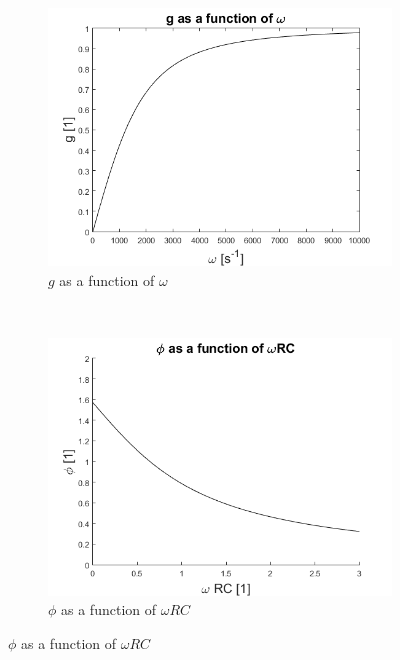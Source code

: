 \documentclass[../main/main.tex]{subfiles}
\begin{document}
\begin{figure}[!ht]
  \centering
  \begin{subfigure}[b]{0.4\textwidth}
      \includegraphics[width=\textwidth]{../img/g_af_omega.png}
      \caption{\( g \) as a function of \( \omega \)}
      \label{fig:g_af_omega}
  \end{subfigure}
  ~ %
  \begin{subfigure}[b]{0.4\textwidth}
      \includegraphics[width=\textwidth]{../img/phi_af_wRC.png}
      \caption{\( \phi \) as a function of \( \omega R C \)}
      \label{fig:phi_af_omega}
  \end{subfigure}
\end{figure}
\end{document}
